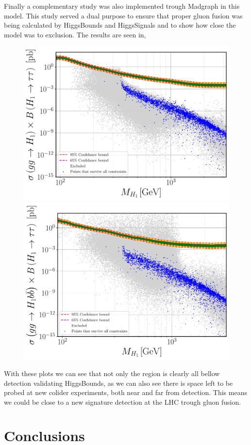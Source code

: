 \documentclass[10pt]{book}
\renewcommand{\(}{\left(}
\renewcommand{\)}{\right)}
\renewcommand{\[}{\left[}
\renewcommand{\]}{\right]}
\begin{document}
Finally a complementary study was also implemented trough Madgraph in this model. 
%
This study served a dual purpose to ensure that proper gluon fusion was being calculated by HiggsBounds and HiggsSignals and to show how close the model was to exclusion. The results are seen in, 
%
\begin{figure}[H]
	\centering
	\includegraphics[width=.49\textwidth]{Images/3HDM/Xsec/Xsec_1_Grey_tight.pdf}	%
	\includegraphics[width=.49\textwidth]{Images/3HDM/Xsec/Xsec_3_Grey_Thight.pdf}
	\caption{}
	\label{}
\end{figure}	
%
With these plots we can see that not only the region is clearly all bellow detection validating HiggsBounds, as we can also see there is space left to be probed at new colider experiments, both near and far from detection. 
%
This means we could be close to a new signature detection at the LHC trough gluon fusion.  


\renewcommand{\cleardoublepage}{}
\renewcommand{\clearpage}{}

\chapter{Conclusions}
\label{ch:Conclusions}

\end{document}
